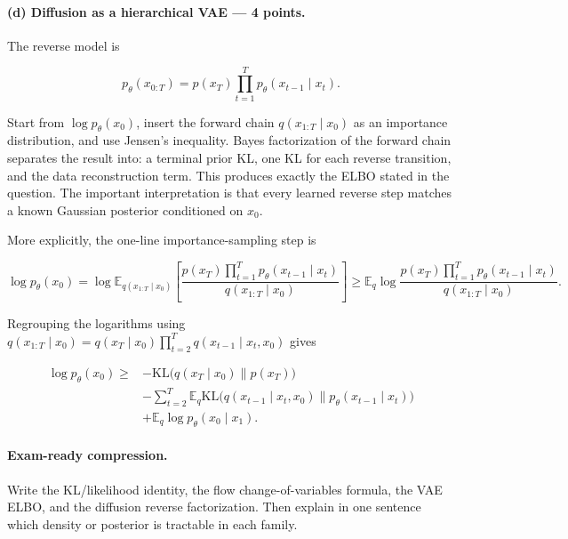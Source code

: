 \documentclass[11pt,a4paper]{article}
\begin{document}
\paragraph{(d) Diffusion as a hierarchical VAE --- 4 points.}

The reverse model is

\[
p_\theta(x_{0:T})
=p(x_T)\prod_{t=1}^{T}p_\theta(x_{t-1}\mid x_t).
\]

Start from $\log p_\theta(x_0)$, insert the forward chain $q(x_{1:T}\mid x_0)$ as an importance distribution, and use Jensen's inequality. Bayes factorization of the forward chain separates the result into: a terminal prior KL, one KL for each reverse transition, and the data reconstruction term. This produces exactly the ELBO stated in the question. The important interpretation is that every learned reverse step matches a known Gaussian posterior conditioned on $x_0$.

More explicitly, the one-line importance-sampling step is

\[
\log p_\theta(x_0)
=\log \mathbb{E}_{q(x_{1:T}\mid x_0)}
\left[
\frac{p(x_T)\prod_{t=1}^{T}p_\theta(x_{t-1}\mid x_t)}
{q(x_{1:T}\mid x_0)}
\right]
\geq \mathbb{E}_{q}\log
\frac{p(x_T)\prod_{t=1}^{T}p_\theta(x_{t-1}\mid x_t)}
{q(x_{1:T}\mid x_0)}.
\]

Regrouping the logarithms using $q(x_{1:T}\mid x_0)=q(x_T\mid x_0)\prod_{t=2}^{T}q(x_{t-1}\mid x_t,x_0)$ gives

\[
\begin{aligned}
\log p_\theta(x_0)
\geq{}&-\mathrm{KL}\bigl(q(x_T\mid x_0)\|p(x_T)\bigr)\\
&-\sum_{t=2}^{T}\mathbb{E}_{q}
\mathrm{KL}\bigl(q(x_{t-1}\mid x_t,x_0)\|p_\theta(x_{t-1}\mid x_t)\bigr)\\
&+\mathbb{E}_{q}\log p_\theta(x_0\mid x_1).
\end{aligned}
\]

\paragraph{Exam-ready compression.}

Write the KL/likelihood identity, the flow change-of-variables formula, the VAE ELBO, and the diffusion reverse factorization. Then explain in one sentence which density or posterior is tractable in each family.
\end{document}
